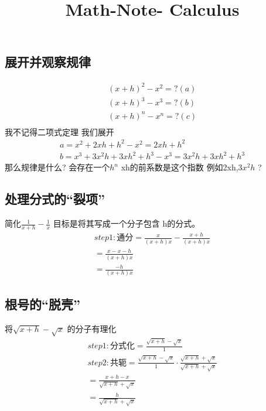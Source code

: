 \documentclass[12pt]{article}
\title{Math-Note- Calculus}
\date{}
\begin{document}
\maketitle

\subsection*{展开并观察规律}
\begin{align}
(x+h)^{2} - x^{2} = ? (a)\\
(x+h)^{3} - x^{3} = ? (b)\\
(x+h)^{n} - x^{n} = ? (c)\\
\end{align}
我不记得二项式定理
我们展开 \\
\begin{align}
a = x^{2} + 2xh + h^{2} - x^{2} 
  = 2xh + h^{2} \\
b = x^{3} + 3x^{2}h + 3xh^{2} + h^{3} - x^{3}
  = 3x^{2}h + 3xh^{2} + h^{3}
\end{align}
那么规律是什么? 会存在一个$h^{n}$ xh的前系数是这个指数 例如2xh,$3x^{2}h$ ?

\subsection*{处理分式的“裂项”}
简化$\frac{1}{x+h} - \frac{1}{x}$ 目标是将其写成一个分子包含 h的分式。
\begin{align}
    step 1: 通分
    = \frac{x}{(x+h)x} - \frac{x+h}{(x+h)x} \\
    = \frac{x-x-h}{(x+h)x} \\
    = \frac{-h}{(x+h)x}
\end{align}

\subsection*{根号的“脱壳”}
将$\sqrt{x+h} - \sqrt{x}$ 的分子有理化
\begin{align}
    step 1: 分式化
    = \frac{\sqrt{x+h} - \sqrt{x}}{1}\\
    step 2: 共轭
    =  \frac{\sqrt{x+h} - \sqrt{x}}{1}  \cdot \frac{\sqrt{x+h} + \sqrt{x}}{\sqrt{x+h} + \sqrt{x}}\\ 
    =  \frac{x+h-x}{ \sqrt{x+h} + \sqrt{x}}\\
    =  \frac{h}{ \sqrt{x+h} + \sqrt{x}}\\    
\end{align}
\end{document}
